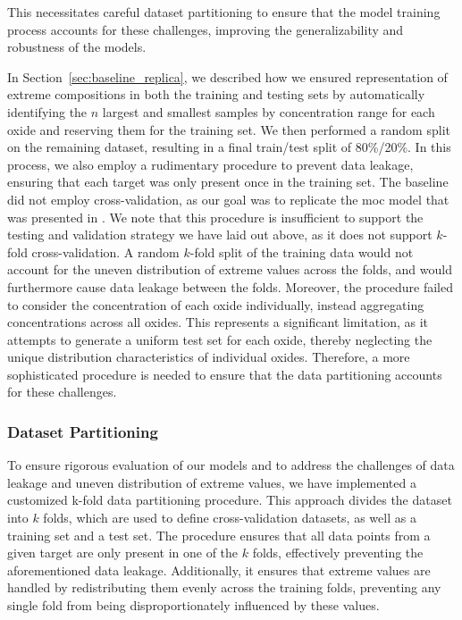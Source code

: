 This necessitates careful dataset partitioning to ensure that the model training process accounts for these challenges, improving the generalizability and robustness of the models.

In Section~\ref{sec:baseline_replica}, we described how we ensured representation of extreme compositions in both the training and testing sets by automatically identifying the $n$ largest and smallest samples by concentration range for each oxide and reserving them for the training set.
We then performed a random split on the remaining dataset, resulting in a final train/test split of 80\%/20\%.
In this process, we also employ a rudimentary procedure to prevent data leakage, ensuring that each target was only present once in the training set.
The baseline did not employ cross-validation, as our goal was to replicate the \gls{moc} model that was presented in \citet{cleggRecalibrationMarsScience2017}.
We note that this procedure is insufficient to support the testing and validation strategy we have laid out above, as it does not support $k$-fold cross-validation.
A random $k$-fold split of the training data would not account for the uneven distribution of extreme values across the folds, and would furthermore cause data leakage between the folds.
Moreover, the procedure failed to consider the concentration of each oxide individually, instead aggregating concentrations across all oxides. This represents a significant limitation, as it attempts to generate a uniform test set for each oxide, thereby neglecting the unique distribution characteristics of individual oxides.
Therefore, a more sophisticated procedure is needed to ensure that the data partitioning accounts for these challenges.

\subsubsection{Dataset Partitioning}\label{subsubsec:dataset_partitioning}
To ensure rigorous evaluation of our models and to address the challenges of data leakage and uneven distribution of extreme values, we have implemented a customized k-fold data partitioning procedure.
This approach divides the dataset into $k$ folds, which are used to define cross-validation datasets, as well as a training set and a test set.
The procedure ensures that all data points from a given target are only present in one of the $k$ folds, effectively preventing the aforementioned data leakage.
Additionally, it ensures that extreme values are handled by redistributing them evenly across the training folds, preventing any single fold from being disproportionately influenced by these values.

